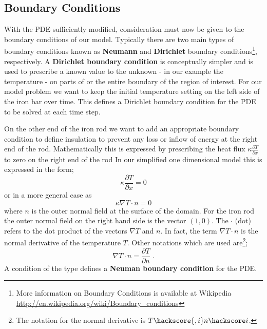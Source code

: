 
\subsection{Boundary Conditions}
\label{SEC BOUNDARY COND}
With the PDE sufficiently modified, consideration must now be given to the boundary conditions of our model. Typically there are two main types of boundary conditions known as \textbf{Neumann} and \textbf{Dirichlet} boundary conditions\footnote{More information on Boundary Conditions is available at Wikipedia \url{http://en.wikipedia.org/wiki/Boundary_conditions}}, respectively. 
A \textbf{Dirichlet boundary condition} is conceptually simpler and is used to prescribe a known value to the unknown - in our example the temperature - on parts of or the entire boundary of the region of interest.
For our model problem we want to keep the initial temperature setting on the left side of the 
iron bar over time. This defines a Dirichlet boundary condition for the PDE  to be solved at each time step. 

On the other end of the iron rod we want to add an appropriate boundary condition to define insulation to prevent
any loss or inflow of energy at the right end of the rod. Mathematically this is expressed by prescribing
the heat flux $\kappa \frac{\partial T}{\partial x}$  to zero on the right end of the rod 
In our simplified one dimensional model this is expressed
in the form;
\begin{equation}
\kappa \frac{\partial T}{\partial x}  = 0 
\end{equation}
or in a more general case as
\begin{equation}\label{NEUMAN 1}
\kappa \nabla T \cdot n  = 0 
\end{equation}
where $n$  is the outer normal field  at the surface of the domain. 
For the iron rod the outer normal field on the right hand side is the vector $(1,0)$. The $\cdot$ (dot) refers to the 
dot product of the vectors $\nabla T$ and $n$. In fact, the term $\nabla T \cdot n$ is the normal derivative of 
the temperature $T$. Other notations which are used are\footnote{The \esc notation for the normal
derivative is $T\hackscore{,i} n\hackscore i$.};
\begin{equation}
\nabla T \cdot n  = \frac{\partial T}{\partial n} \; .
\end{equation}
A condition of the type  defines a \textbf{Neuman boundary condition} for the PDE. 

